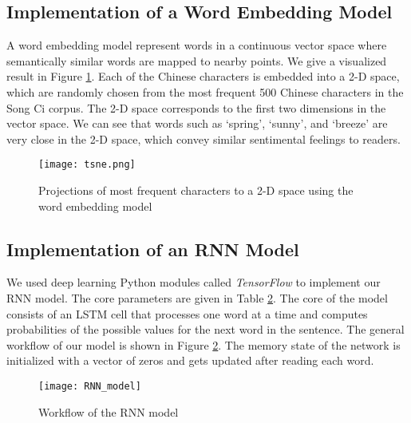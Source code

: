 \subsection{Implementation of a Word Embedding Model }
A word embedding model represent words in a continuous vector space where semantically similar words are mapped to nearby points.
%
%
We give a visualized result in Figure \ref{fig:VSM}. 
%
Each of the Chinese characters is embedded into a 2-D space, which are randomly chosen from the most frequent 500 Chinese characters in the Song Ci corpus. The 2-D space corresponds to the first two dimensions in the vector space. We can see that words such as `spring', `sunny', and `breeze' are very close in the 2-D space, which convey similar sentimental feelings to readers.

\begin{figure}[htbp]
	\centering
	\texttt{[image: tsne.png]}
	\caption{Projections of most frequent characters to a 2-D space using the word embedding model}
	\label{fig:VSM}
\end{figure}


\subsection{Implementation of an RNN Model} 
%
We used deep learning Python modules called \emph{TensorFlow} \cite{tensorflow} to implement our RNN model. The core parameters are given in Table \ref{fig:rnn_workflow}.
%
The core of the model consists of an LSTM cell that processes one word at a time and computes probabilities of the possible values for the next word in the sentence. 
%
The general workflow of our model is shown in Figure \ref{fig:rnn_workflow}.
%
The memory state of the network is initialized with a vector of zeros and gets updated after reading each word. 



\begin{figure}[htbp]
	\centering
	\texttt{[image: RNN\_model]}
	\caption{Workflow of the RNN model}
	\label{fig:rnn_workflow}
\end{figure}

